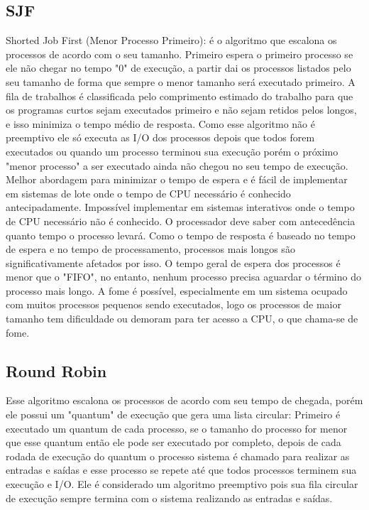 \documentclass[times, 10pt,twocolumn]{article}
\begin{document}
\subsection{SJF} 
Shorted Job First (Menor Processo Primeiro): é o algoritmo que escalona os processos de acordo com o seu tamanho. Primeiro espera o primeiro processo se ele não chegar no tempo "0" de execução, a partir dai os processos listados pelo seu tamanho de forma que sempre o menor tamanho será executado primeiro. A fila de trabalhos é classificada pelo comprimento estimado do trabalho para que os programas curtos sejam executados primeiro e não sejam retidos pelos longos, e isso minimiza o tempo médio de resposta. Como esse algoritmo não é preemptivo ele só executa as I/O dos processos depois que todos forem executados ou quando um processo terminou sua execução porém o próximo "menor processo" a ser executado ainda não chegou no seu tempo de execução. Melhor abordagem para minimizar o tempo de espera e é fácil de implementar em sistemas de lote onde o tempo de CPU necessário é conhecido antecipadamente.
Impossível implementar em sistemas interativos onde o tempo de CPU necessário não é conhecido. O processador deve saber com antecedência quanto tempo o processo levará. \cite{tutorialspoint}
Como o tempo de resposta é baseado no tempo de espera e no tempo de processamento, processos mais longos são significativamente afetados por isso. O tempo geral de espera dos processos é menor que o "FIFO", no entanto, nenhum processo precisa aguardar o término do processo mais longo.
A fome é possível, especialmente em um sistema ocupado com muitos processos pequenos sendo executados, logo os processos de maior tamanho tem dificuldade ou demoram para ter acesso a CPU, o que chama-se de fome. \cite{rutgers}

\subsection{Round Robin} 
Esse algoritmo escalona os processos de acordo com seu tempo de chegada, porém ele possui um "quantum" de execução que gera uma lista circular: Primeiro é executado um quantum de cada processo, se o tamanho do processo for menor que esse quantum então ele pode ser executado por completo, depois de cada rodada de execução do quantum o processo sistema é chamado para realizar as entradas e saídas e esse processo se repete até que todos processos terminem sua execução e I/O. Ele é considerado um algoritmo preemptivo pois sua fila circular de execução sempre termina com o sistema realizando as entradas e saídas. \cite{rutgers} 
\end{document}
